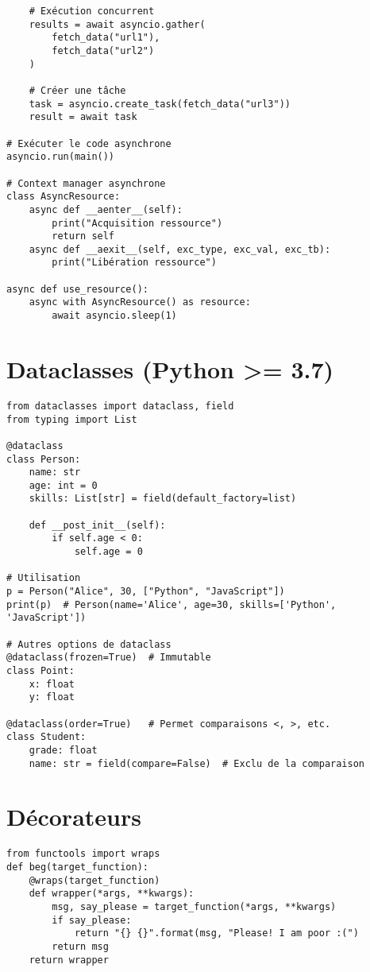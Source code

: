 \documentclass{article}
\begin{document}
\begin{multicols*}{4}
\begin{lstlisting}
    # Exécution concurrent
    results = await asyncio.gather(
        fetch_data("url1"),
        fetch_data("url2")
    )
    
    # Créer une tâche
    task = asyncio.create_task(fetch_data("url3"))
    result = await task

# Exécuter le code asynchrone
asyncio.run(main())

# Context manager asynchrone
class AsyncResource:
    async def __aenter__(self):
        print("Acquisition ressource")
        return self
    async def __aexit__(self, exc_type, exc_val, exc_tb):
        print("Libération ressource")

async def use_resource():
    async with AsyncResource() as resource:
        await asyncio.sleep(1)
\end{lstlisting}

\section*{Dataclasses (Python >= 3.7)}
\begin{lstlisting}
from dataclasses import dataclass, field
from typing import List

@dataclass
class Person:
    name: str
    age: int = 0
    skills: List[str] = field(default_factory=list)
    
    def __post_init__(self):
        if self.age < 0:
            self.age = 0

# Utilisation
p = Person("Alice", 30, ["Python", "JavaScript"])
print(p)  # Person(name='Alice', age=30, skills=['Python', 'JavaScript'])

# Autres options de dataclass
@dataclass(frozen=True)  # Immutable
class Point:
    x: float
    y: float

@dataclass(order=True)   # Permet comparaisons <, >, etc.
class Student:
    grade: float
    name: str = field(compare=False)  # Exclu de la comparaison
\end{lstlisting}

\section*{Décorateurs}
\begin{lstlisting}
from functools import wraps
def beg(target_function):
    @wraps(target_function)
    def wrapper(*args, **kwargs):
        msg, say_please = target_function(*args, **kwargs)
        if say_please:
            return "{} {}".format(msg, "Please! I am poor :(")
        return msg
    return wrapper


\end{lstlisting}
\end{multicols*}
\end{document}
